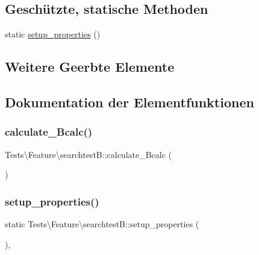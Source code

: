 \subsection*{Geschützte, statische Methoden}
\begin{DoxyCompactItemize}
\item 
static \hyperlink{classTests_1_1Feature_1_1searchtestB_af6adf271be232236de244a1d7065e38b}{setup\+\_\+properties} ()
\end{DoxyCompactItemize}
\subsection*{Weitere Geerbte Elemente}


\subsection{Dokumentation der Elementfunktionen}
\mbox{\label{classTests_1_1Feature_1_1searchtestB_a0fc78426cd59ec589fcbbf1b0a8420f2}} 
\subsubsection{\texorpdfstring{calculate\+\_\+\+Bcalc()}{calculate\_Bcalc()}}
{\footnotesize\ttfamily Tests\textbackslash{}\+Feature\textbackslash{}searchtest\+B\+::calculate\+\_\+\+Bcalc (\begin{DoxyParamCaption}{ }\end{DoxyParamCaption})}

\mbox{\label{classTests_1_1Feature_1_1searchtestB_af6adf271be232236de244a1d7065e38b}} 
\subsubsection{\texorpdfstring{setup\+\_\+properties()}{setup\_properties()}}
{\footnotesize\ttfamily static Tests\textbackslash{}\+Feature\textbackslash{}searchtest\+B\+::setup\+\_\+properties (\begin{DoxyParamCaption}{ }\end{DoxyParamCaption})\hspace{0.3cm}{\ttfamily [static]}, {\ttfamily [protected]}}



